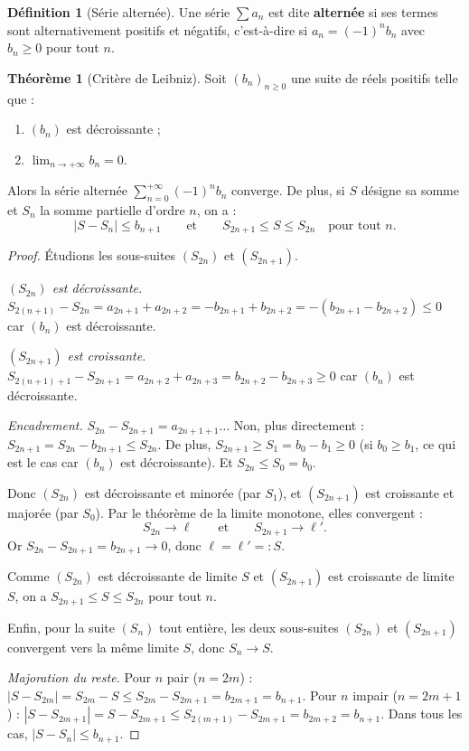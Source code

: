 \documentclass[12pt,a4paper,openany]{book}
\theoremstyle{definition}
\newtheorem{definition}{Définition}[chapter]
\newtheorem{theoreme}{Théorème}[chapter]
\newcommand{\abs}[1]{\left\lvert #1 \right\rvert}
\begin{document}
\begin{definition}[Série alternée]\label{def:serie-alternee}
  Une série $\sum a_n$ est dite \textbf{alternée} si ses termes sont alternativement
  positifs et négatifs, c'est-à-dire si $a_n = (-1)^n b_n$ avec $b_n \geq 0$ pour tout $n$.
\end{definition}

\begin{theoreme}[Critère de Leibniz]\label{thm:leibniz}
  Soit $(b_n)_{n \geq 0}$ une suite de réels positifs telle que :
  \begin{enumerate}[label=(\roman*)]
    \item $(b_n)$ est décroissante ;
    \item $\lim_{n \to +\infty} b_n = 0$.
  \end{enumerate}
  Alors la série alternée $\sum_{n=0}^{+\infty} (-1)^n b_n$ converge. De plus, si $S$
  désigne sa somme et $S_n$ la somme partielle d'ordre $n$, on a :
  \[
    \abs{S - S_n} \leq b_{n+1}
    \qquad \text{et} \qquad
    S_{2n+1} \leq S \leq S_{2n} \quad \text{pour tout } n.
  \]
\end{theoreme}

\begin{proof}
  Étudions les sous-suites $(S_{2n})$ et $(S_{2n+1})$.

  \textit{$(S_{2n})$ est décroissante.}
  $S_{2(n+1)} - S_{2n} = a_{2n+1} + a_{2n+2} = -b_{2n+1} + b_{2n+2} = -(b_{2n+1} - b_{2n+2}) \leq 0$
  car $(b_n)$ est décroissante.

  \textit{$(S_{2n+1})$ est croissante.}
  $S_{2(n+1)+1} - S_{2n+1} = a_{2n+2} + a_{2n+3} = b_{2n+2} - b_{2n+3} \geq 0$
  car $(b_n)$ est décroissante.

  \textit{Encadrement.}
  $S_{2n} - S_{2n+1} = a_{2n+1+1}\ldots$ Non, plus directement :
  $S_{2n+1} = S_{2n} - b_{2n+1} \leq S_{2n}$.
  De plus, $S_{2n+1} \geq S_1 = b_0 - b_1 \geq 0$ (si $b_0 \geq b_1$, ce qui est
  le cas car $(b_n)$ est décroissante). Et $S_{2n} \leq S_0 = b_0$.

  Donc $(S_{2n})$ est décroissante et minorée (par $S_1$), et $(S_{2n+1})$ est croissante
  et majorée (par $S_0$). Par le théorème de la limite monotone, elles convergent :
  \[
    S_{2n} \to \ell \qquad \text{et} \qquad S_{2n+1} \to \ell'.
  \]
  Or $S_{2n} - S_{2n+1} = b_{2n+1} \to 0$, donc $\ell = \ell' =: S$.

  Comme $(S_{2n})$ est décroissante de limite $S$ et $(S_{2n+1})$ est croissante de
  limite $S$, on a $S_{2n+1} \leq S \leq S_{2n}$ pour tout $n$.

  Enfin, pour la suite $(S_n)$ tout entière, les deux sous-suites
  $(S_{2n})$ et $(S_{2n+1})$ convergent vers la même limite $S$, donc $S_n \to S$.

  \textit{Majoration du reste.} Pour $n$ pair ($n = 2m$) :
  $\abs{S - S_{2m}} = S_{2m} - S \leq S_{2m} - S_{2m+1} = b_{2m+1} = b_{n+1}$.
  Pour $n$ impair ($n = 2m+1$) :
  $\abs{S - S_{2m+1}} = S - S_{2m+1} \leq S_{2(m+1)} - S_{2m+1} = b_{2m+2} = b_{n+1}$.
  Dans tous les cas, $\abs{S - S_n} \leq b_{n+1}$.
\end{proof}
\end{document}
